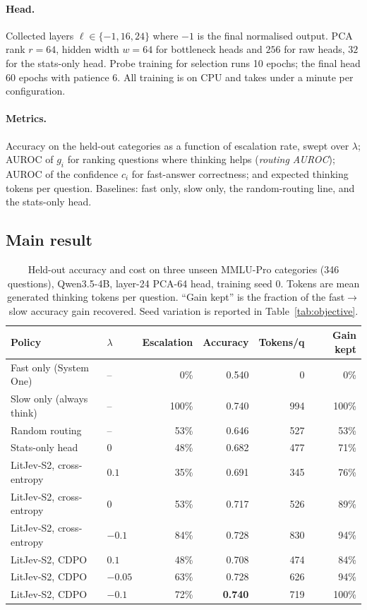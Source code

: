 \documentclass{article}
\newcommand{\gain}{g}
\newcommand{\method}{LitJev-S2}
\newcommand{\cdpo}{CDPO}
\begin{document}
\paragraph{Head.}
Collected layers $\ell\in\{-1,16,24\}$ where $-1$ is the final normalised output. PCA rank $r=64$, hidden width $w=64$ for bottleneck heads and $256$ for raw heads, $32$ for the stats-only head. Probe training for selection runs 10 epochs; the final head 60 epochs with patience 6. All training is on CPU and takes under a minute per configuration.

\paragraph{Metrics.}
Accuracy on the held-out categories as a function of escalation rate, swept over $\lambda$; AUROC of $\gain_i$ for ranking questions where thinking helps (\emph{routing AUROC}); AUROC of the confidence $c_i$ for fast-answer correctness; and expected thinking tokens per question. Baselines: fast only, slow only, the random-routing line, and the stats-only head.

\subsection{Main result}

\begin{table}[t]
\caption{Held-out accuracy and cost on three unseen MMLU-Pro categories (346 questions), Qwen3.5-4B, layer-24 PCA-64 head, training seed 0. Tokens are mean generated thinking tokens per question. ``Gain kept'' is the fraction of the fast$\to$slow accuracy gain recovered. Seed variation is reported in Table~\ref{tab:objective}.}
\label{tab:main}
\centering
\small
\begin{tabular}{llrrrr}
\toprule
Policy & $\lambda$ & Escalation & Accuracy & Tokens/q & Gain kept \\
\midrule
Fast only (System One) & -- & 0\% & 0.540 & 0 & 0\% \\
Slow only (always think) & -- & 100\% & 0.740 & 994 & 100\% \\
\midrule
Random routing & -- & 53\% & 0.646 & 527 & 53\% \\
Stats-only head & 0 & 48\% & 0.682 & 477 & 71\% \\
\method{}, cross-entropy & $0.1$ & 35\% & 0.691 & 345 & 76\% \\
\method{}, cross-entropy & $0$ & 53\% & 0.717 & 526 & 89\% \\
\method{}, cross-entropy & $-0.1$ & 84\% & 0.728 & 830 & 94\% \\
\midrule
\method{}, \cdpo{} & $0.1$ & 48\% & 0.708 & 474 & 84\% \\
\method{}, \cdpo{} & $-0.05$ & 63\% & 0.728 & 626 & 94\% \\
\method{}, \cdpo{} & $-0.1$ & 72\% & \textbf{0.740} & 719 & 100\% \\
\bottomrule
\end{tabular}
\end{table}
\end{document}
